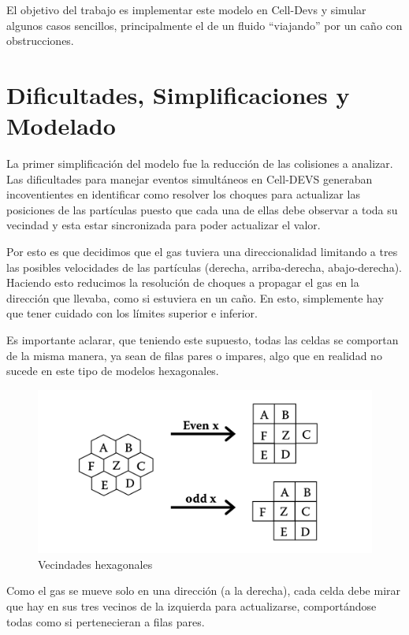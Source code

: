\documentclass[10pt,a4paper]{article}
\begin{document}
El objetivo del trabajo es implementar este modelo en Cell-Devs y simular algunos casos sencillos, principalmente el de un fluido ``viajando'' por un caño con obstrucciones.

\section*{Dificultades, Simplificaciones y Modelado}
La primer simplificaci\'on del modelo fue la reducci\'on de las colisiones a analizar. Las dificultades para manejar eventos simult\'aneos en Cell-DEVS generaban incoventientes en identificar como resolver los choques para actualizar las posiciones de las part\'iculas puesto que cada una de ellas debe observar a toda su vecindad y esta estar sincronizada para poder actualizar el valor.

Por esto es que decidimos que el gas tuviera una direccionalidad limitando a tres las posibles velocidades de las part\'iculas (derecha, arriba-derecha, abajo-derecha). Haciendo esto reducimos la resoluci\'on de choques a propagar el gas en la direcci\'on que llevaba, como si estuviera en un ca\~no. En esto, simplemente hay que tener cuidado con los l\'imites superior e inferior.

Es importante aclarar, que teniendo este supuesto, todas las celdas se comportan de la misma manera, ya sean de filas pares o impares, algo que en realidad no sucede en este tipo de modelos hexagonales.

\begin{figure}[H]
\centering
\includegraphics[scale=0.4]{vecindad}
\caption{Vecindades hexagonales}
\end{figure}

Como el gas se mueve solo en una direcci\'on (a la derecha), cada celda debe mirar que hay en sus tres vecinos de la izquierda para actualizarse, comport\'andose todas como si pertenecieran a filas pares.
\end{document}
